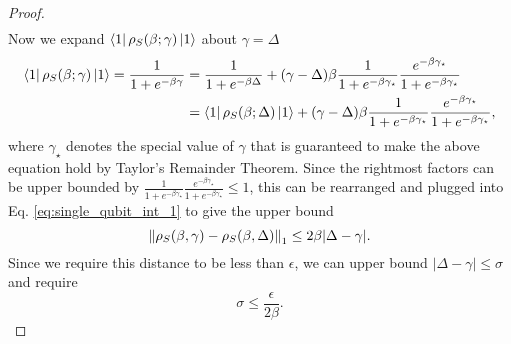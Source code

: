 \begin{proof}
\begin{align}
 \end{align}
    Now we expand $\bra{1} \rho_S(\beta; \gamma) \ket{1}$ about $\gamma = \Delta$
    \begin{align}
    \bra{1} \rho_S(\beta; \gamma) \ket{1} = \frac{1}{1 + e^{-\beta \gamma}} &= \frac{1}{1 + e^{-\beta \Delta}} + (\gamma - \Delta) \beta \frac{1}{1 + e^{-\beta \gamma_{\star}}} \frac{e^{-\beta \gamma_{\star}}}{1 + e^{-\beta \gamma_{\star}}} \\
    &= \bra{1} \rho_S(\beta; \Delta) \ket{1} + (\gamma - \Delta) \beta \frac{1}{1 + e^{-\beta \gamma_{\star}}} \frac{e^{-\beta \gamma_{\star}}}{1 + e^{-\beta \gamma_{\star}}},
    \end{align}
    where $\gamma_{\star}$ denotes the special value of $\gamma$ that is guaranteed to make the above equation hold by Taylor's Remainder Theorem.
    Since the rightmost factors can be upper bounded by $\frac{1}{1 + e^{-\beta \gamma_{\star}}} \frac{e^{-\beta \gamma_{\star}}}{1 + e^{-\beta \gamma_{\star}}} \le 1$, this can be rearranged and plugged into Eq. \eqref{eq:single_qubit_int_1} to give the upper bound
 \begin{equation}
 \norm{\rho_S(\beta, \gamma) - \rho_S(\beta, \Delta)}_1 \le 2 \beta |\Delta - \gamma|.
 \end{equation}
Since we require this distance to be less than $\epsilon$, we can upper bound $|\Delta - \gamma| \le \sigma$ and require
\begin{equation}
    \sigma \le \frac{\epsilon}{2 \beta}. \label{eq:single_qubit_ineq_1}
\end{equation}


\end{proof}
